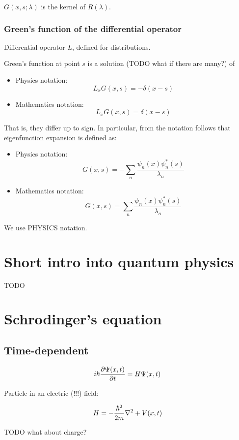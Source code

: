 \documentclass[12pt, a4paper]{article}
\begin{document}
$G(x, s; \lambda)$ is the kernel of $R(\lambda)$.


\subsubsection{Green's function of the differential operator}
Differential operator $L$, defined for distributions.

Green's function at point $s$ is a solution (TODO what if there are many?) of 

\begin{itemize}
\item Physics notation: $$L_x G(x, s) = -\delta(x - s)$$
\item Mathematics notation: $$L_x G(x, s) = \delta(x - s)$$
\end{itemize} 

That is, they differ up to sign. In particular, from the notation follows that eigenfunction expansion is defined as: 

\begin{itemize}
\item Physics notation: $$G(x, s) = -\sum\limits_n \frac{\psi_n(x) \psi_n^*(s)}{\lambda_n}$$
\item Mathematics notation: $$G(x, s) = \sum\limits_n \frac{\psi_n(x) \psi_n^*(s)}{\lambda_n}$$
\end{itemize} 

We use PHYSICS notation. 

\section{Short intro into quantum physics}
TODO

\section{Schrodinger's equation}

\subsection{Time-dependent}

$$i \hbar \pdv{\Psi(x, t)}{t} = H \Psi(x, t)$$

Particle in an electric (!!!) field:

$$H = - \frac{\hbar^2}{2 m} \laplacian + V(x, t)$$


TODO what about charge?
\end{document}
